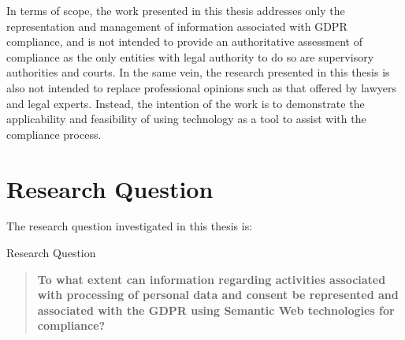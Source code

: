 In terms of scope, the work presented in this thesis addresses only the representation and management of information associated with GDPR compliance, and is not intended to provide an authoritative assessment of  compliance as the only entities with legal authority to do so are supervisory authorities and courts.
In the same vein, the research presented in this thesis is also not intended to replace professional opinions such as that offered by lawyers and legal experts.
Instead, the intention of the work is to demonstrate the applicability and feasibility of using technology as a tool to assist with the compliance process.

\section{Research Question}\label{sec:intro:RQ}
The research question investigated in this thesis is:
\begin{framed}
\small{Research Question}
\begin{quote}
\textbf{To what extent can information regarding activities associated with processing of personal data and consent be represented and associated with the GDPR using Semantic Web technologies for compliance?}
\end{quote}
\end{framed}

